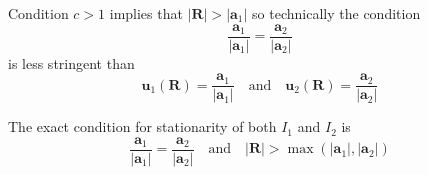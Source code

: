 \documentclass[12pt]{article}
\begin{document}
Condition $c>1$ implies that $|\mathbf R|>|\mathbf a_1|$
so technically the condition
\begin{equation*}
\frac{\mathbf a_1}{|\mathbf a_1|}=\frac{\mathbf a_2}{|\mathbf a_2|}
\end{equation*}
is less stringent than
\begin{equation*}
\mathbf u_1(\mathbf R)=\frac{\mathbf a_1}{|\mathbf a_1|}
\quad\text{and}\quad
\mathbf u_2(\mathbf R)=\frac{\mathbf a_2}{|\mathbf a_2|}
\end{equation*}

The exact condition for stationarity of both $I_1$ and $I_2$ is
\begin{equation*}
\frac{\mathbf a_1}{|\mathbf a_1|}=\frac{\mathbf a_2}{|\mathbf a_2|}
\quad\text{and}\quad
|\mathbf R|>\max(|\mathbf a_1|,|\mathbf a_2|)
\end{equation*}
\end{document}
